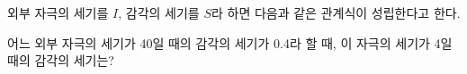 외부 자극의 세기를 $I$, 감각의 세기를 $S$라 하면 다음과 같은 관계식이 성립한다고 한다.\par\smallskip{}\par\smallskip\noindent 어느 외부 자극의 세기가 40일 때의 감각의 세기가 0.4라 할 때, 이 자극의 세기가 4일 때의 감각의 세기는? 
